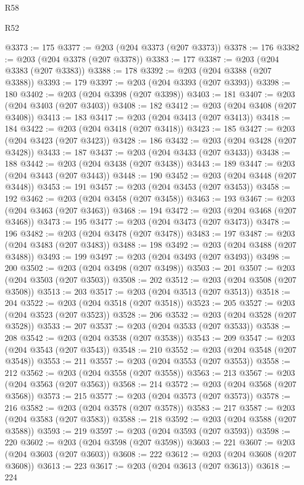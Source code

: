 \begin{lexlean}{R58}
\begin{lexlean}{R52}
\begin{coremodule}
{{{{{{{{{{{{{{{{{{{{{{{{{{{{{{{{{{{{{{{{{{{{{{{{{{{{{{{{{{{{{{{{{{{{{{{{{{{{{{{{{{{{{{{{{{{{{{{{{{{{{{{{{{{{{{{{{{{{{{{{{{{{{{{{{{{{{{{{{{{{{{{{{{{{{{{{{{{{{{{{{{{{{{{{{{{{{{{{{{{{{{{{{{{{{{{{{{{{{{@3373 := 175
@3377 := @203 (@204 @3373 (@207 @3373))
@3378 := 176
@3382 := @203 (@204 @3378 (@207 @3378))
@3383 := 177
@3387 := @203 (@204 @3383 (@207 @3383))
@3388 := 178
@3392 := @203 (@204 @3388 (@207 @3388))
@3393 := 179
@3397 := @203 (@204 @3393 (@207 @3393))
@3398 := 180
@3402 := @203 (@204 @3398 (@207 @3398))
@3403 := 181
@3407 := @203 (@204 @3403 (@207 @3403))
@3408 := 182
@3412 := @203 (@204 @3408 (@207 @3408))
@3413 := 183
@3417 := @203 (@204 @3413 (@207 @3413))
@3418 := 184
@3422 := @203 (@204 @3418 (@207 @3418))
@3423 := 185
@3427 := @203 (@204 @3423 (@207 @3423))
@3428 := 186
@3432 := @203 (@204 @3428 (@207 @3428))
@3433 := 187
@3437 := @203 (@204 @3433 (@207 @3433))
@3438 := 188
@3442 := @203 (@204 @3438 (@207 @3438))
@3443 := 189
@3447 := @203 (@204 @3443 (@207 @3443))
@3448 := 190
@3452 := @203 (@204 @3448 (@207 @3448))
@3453 := 191
@3457 := @203 (@204 @3453 (@207 @3453))
@3458 := 192
@3462 := @203 (@204 @3458 (@207 @3458))
@3463 := 193
@3467 := @203 (@204 @3463 (@207 @3463))
@3468 := 194
@3472 := @203 (@204 @3468 (@207 @3468))
@3473 := 195
@3477 := @203 (@204 @3473 (@207 @3473))
@3478 := 196
@3482 := @203 (@204 @3478 (@207 @3478))
@3483 := 197
@3487 := @203 (@204 @3483 (@207 @3483))
@3488 := 198
@3492 := @203 (@204 @3488 (@207 @3488))
@3493 := 199
@3497 := @203 (@204 @3493 (@207 @3493))
@3498 := 200
@3502 := @203 (@204 @3498 (@207 @3498))
@3503 := 201
@3507 := @203 (@204 @3503 (@207 @3503))
@3508 := 202
@3512 := @203 (@204 @3508 (@207 @3508))
@3513 := 203
@3517 := @203 (@204 @3513 (@207 @3513))
@3518 := 204
@3522 := @203 (@204 @3518 (@207 @3518))
@3523 := 205
@3527 := @203 (@204 @3523 (@207 @3523))
@3528 := 206
@3532 := @203 (@204 @3528 (@207 @3528))
@3533 := 207
@3537 := @203 (@204 @3533 (@207 @3533))
@3538 := 208
@3542 := @203 (@204 @3538 (@207 @3538))
@3543 := 209
@3547 := @203 (@204 @3543 (@207 @3543))
@3548 := 210
@3552 := @203 (@204 @3548 (@207 @3548))
@3553 := 211
@3557 := @203 (@204 @3553 (@207 @3553))
@3558 := 212
@3562 := @203 (@204 @3558 (@207 @3558))
@3563 := 213
@3567 := @203 (@204 @3563 (@207 @3563))
@3568 := 214
@3572 := @203 (@204 @3568 (@207 @3568))
@3573 := 215
@3577 := @203 (@204 @3573 (@207 @3573))
@3578 := 216
@3582 := @203 (@204 @3578 (@207 @3578))
@3583 := 217
@3587 := @203 (@204 @3583 (@207 @3583))
@3588 := 218
@3592 := @203 (@204 @3588 (@207 @3588))
@3593 := 219
@3597 := @203 (@204 @3593 (@207 @3593))
@3598 := 220
@3602 := @203 (@204 @3598 (@207 @3598))
@3603 := 221
@3607 := @203 (@204 @3603 (@207 @3603))
@3608 := 222
@3612 := @203 (@204 @3608 (@207 @3608))
@3613 := 223
@3617 := @203 (@204 @3613 (@207 @3613))
@3618 := 224
}}}}}}}}}}}}}}}}}}}}}}}}}}}}}}}}}}}}}}}}}}}}}}}}}}}}}}}}}}}}}}}}}}}}}}}}}}}}}}}}}}}}}}}}}}}}}}}}}}}}}}}}}}}}}}}}}}}}}}}}}}}}}}}}}}}}}}}}}}}}}}}}}}}}}}}}}}}}}}}}}}}}}}}}}}}}}}}}}}}}}}}}}}}}}}}}}}}}}}
\end{coremodule}
\end{lexlean}
\end{lexlean}
